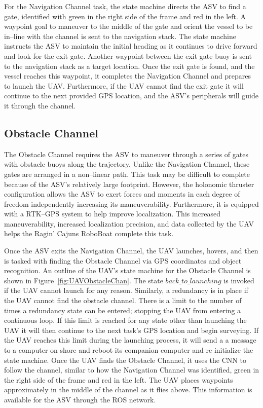 \documentclass[letterpaper, 12 pt, conference]{ieeeconf}
\begin{document}
For the Navigation Channel task, the state machine directs the ASV to find a gate, identified with green in the right side of the frame and red in the left. A waypoint goal to maneuver to the middle of the gate and orient the vessel to be in--line with the channel is sent to the navigation stack. The state machine instructs the ASV to maintain the initial heading as it continues to drive forward and look for the exit gate. Another waypoint between the exit gate buoy is sent to the navigation stack as a target location. Once the exit gate is found, and the vessel reaches this waypoint, it completes the Navigation Channel and prepares to launch the UAV. Furthermore, if the UAV cannot find the exit gate it will continue to the next provided GPS location, and the ASV's peripherals will guide it through the channel. 
\subsection{Obstacle Channel}
\label{ObstacleChannel}
% 
The Obstacle Channel requires the ASV to maneuver through a series of gates with obstacle buoys along the trajectory. Unlike the Navigation Channel, these gates are arranged in a non--linear path. This task may be difficult to complete because of the ASV's relatively large footprint. However, the holonomic thruster configuration allows the ASV to exert forces and moments in each degree of freedom independently increasing its maneuverability. Furthermore, it is equipped with a RTK--GPS system to help improve localization. This increased maneuverability, increased localization precision, and data collected by the UAV helps the Ragin' Cajuns RoboBoat complete this task.

Once the ASV exits the Navigation Channel, the UAV launches, hovers, and then is tasked with finding the Obstacle Channel via GPS coordinates and object recognition. An outline of the UAV's state machine for the Obstacle Channel is shown in Figure~\ref{fig:UAVObstacleChan}. The state $back\_to\_launching$ is invoked if the UAV cannot launch for any reason. Similarly, a redundancy is in place if the UAV cannot find the obstacle channel. There is a limit to the number of times a redundancy state can be entered; stopping the UAV from entering a continuous loop. If this limit is reached for any state other than launching the UAV it will then continue to the next task's GPS location and begin surveying. If the UAV reaches this limit during the launching process, it will send a a message to a computer on shore and reboot its companion computer and re initialize the state machine. Once the UAV finds the Obstacle Channel, it uses the CNN to follow the channel, similar to how the Navigation Channel was identified, green in the right side of the frame and red in the left. The UAV places waypoints approximately in the middle of the channel as it flies above. This information is available for the ASV through the ROS network. 
\end{document}
